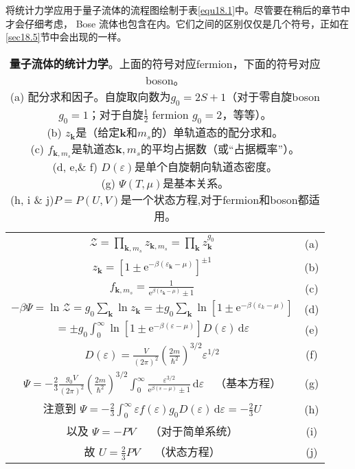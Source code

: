 将统计力学应用于量子流体的流程图绘制于表\ref{equ18.1}中。尽管要在稍后的章节中才会仔细考虑， Bose 流体也包含在内。它们之间的区别仅仅是几个符号，正如在\ref{sec18.5}节中会出现的一样。

\begin{table}
\caption{{\bf 量子流体的统计力学}。上面的符号对应fermion，下面的符号对应boson。 \\ 
(a) 配分求和因子。自旋取向数为$g_0=2S+1$（对于零自旋boson $g_0=1$；对于自旋$\frac{1}{2}$ fermion $g_0=2$，等等）。\\
(b) $z_{\mathbf k}$是（给定$\mathbf k$和$m_s$的）单轨道态的配分求和。\\
(c) $f_{{\mathbf k},m_s}$是轨道态${{\mathbf k},m_s}$的平均占据数（或``占据概率''）。\\
(d, e,\& f) $D(\varepsilon)$是单个自旋朝向轨道态密度。\\
(g) $\Psi(T,\mu)$是基本关系。\\
(h, i \& j)$P=P(U,V)$是一个状态方程,对于fermion和boson都适用。}
\begin{tabular}{cc}
\toprule
$\mathcal Z=\prod_{{\mathbf k},m_s}z_{{\mathbf k},m_s}=\prod_{{\mathbf k}}z^{g_0}_{{\mathbf k}}$ & (a) \\
$z_{\mathbf k}=\left[1\pm\mathrm e^{-\beta(\varepsilon_{\mathbf k}-\mu)}\right]^{\pm 1}$ & (b) \\
$f_{{\mathbf k},m_s}=\frac{1}{\mathrm e^{\beta(\varepsilon_{\mathbf k}-\mu)}\pm 1}$ & (c) \\
$-\beta\Psi=\ln\mathcal Z=g_0\sum_{\mathbf k}\ln z_{\mathbf k}=\pm g_0\sum_{\mathbf k}\ln[1\pm\mathrm e^{-\beta(\varepsilon_k-\mu)}]$ & (d) \\
$=\pm g_0\int_0^\infty\ln[1\pm\mathrm e^{-\beta(\varepsilon-\mu)}]D(\varepsilon)\,\mathrm d\varepsilon$ & (e) \\
$D(\varepsilon)=\frac{V}{(2\pi)^2}\left(\frac{2m}{\hbar^2}\right)^{3/2}\varepsilon^{1/2}$ & (f) \\
$\Psi=-\frac{2}{3}\frac{g_0V}{(2\pi)^2}(\frac{2m}{\hbar^2})^{3/2}\int_0^\infty\frac{\varepsilon^{3/2}}{\mathrm e^{\beta(\varepsilon-\mu)}\pm 1}\,\mathrm d\varepsilon\quad$（基本方程）& (g) \\
注意到 $\Psi=-\frac{2}{3}\int_0^\infty\varepsilon f(\varepsilon)g_0D(\varepsilon)\,\mathrm d\varepsilon=-\frac{2}{3}U$ & (h) \\
以及 $\Psi=-PV\quad$ （对于简单系统）& (i) \\
故 $U=\frac{2}{3}PV\quad$ （状态方程）&(j) \\
\bottomrule
\end{tabular}
\label{tab18.1}
\end{table}

